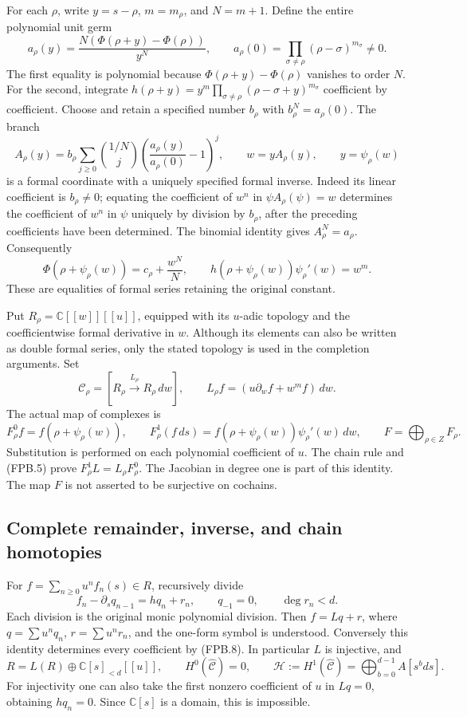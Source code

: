 For each \(\rho\), write \(y=s-\rho\), \(m=m_\rho\), and \(N=m+1\).
Define the entire polynomial unit germ
\[
 a_\rho(y)=\frac{N(\Phi(\rho+y)-\Phi(\rho))}{y^N},
 \qquad
 a_\rho(0)=\prod_{\sigma\ne\rho}(\rho-\sigma)^{m_\sigma}\ne0.
 \tag{FPB.3}\label{eq:fpb-a}
\]
The first equality is polynomial because \(\Phi(\rho+y)-\Phi(\rho)\)
vanishes to order \(N\). For the second, integrate
\(h(\rho+y)=y^m\prod_{\sigma\ne\rho}(\rho-\sigma+y)^{m_\sigma}\)
coefficient by coefficient. Choose and retain a specified number
\(b_\rho\) with \(b_\rho^N=a_\rho(0)\). The branch
\[
 A_\rho(y)=b_\rho
 \sum_{j\ge0}\binom{1/N}{j}
       \left(\frac{a_\rho(y)}{a_\rho(0)}-1\right)^j,
 \qquad w=yA_\rho(y),\qquad y=\psi_\rho(w)
 \tag{FPB.4}\label{eq:fpb-coordinate}
\]
is a formal coordinate with a uniquely specified formal inverse.
Indeed its linear coefficient is \(b_\rho\ne0\); equating the
coefficient of \(w^n\) in \(\psi A_\rho(\psi)=w\) determines the
coefficient of \(w^n\) in \(\psi\) uniquely by division by
\(b_\rho\), after the preceding coefficients have been determined.
The binomial identity gives \(A_\rho^N=a_\rho\). Consequently
\[
 \Phi(\rho+\psi_\rho(w))=c_\rho+\frac{w^N}{N},
 \qquad h(\rho+\psi_\rho(w))\psi_\rho'(w)=w^m.
 \tag{FPB.5}\label{eq:fpb-phase}
\]
These are equalities of formal series retaining the original constant.

Put \(R_\rho=\mathbb{C}[[w]][[u]]\), equipped with its \(u\)-adic
topology and the coefficientwise formal derivative in \(w\). Although
its elements can also be written as double formal series, only the
stated topology is used in the completion arguments. Set
\[
 \mathcal C_\rho=[R_\rho\xrightarrow{L_\rho}R_\rho\,dw],
 \qquad L_\rho f=(u\partial_w f+w^m f)\,dw.
 \tag{FPB.6}\label{eq:fpb-local-complex}
\]
The actual map of complexes is
\[
 F^0_\rho f=f(\rho+\psi_\rho(w)),\qquad
 F^1_\rho(f\,ds)=f(\rho+\psi_\rho(w))\psi_\rho'(w)\,dw,
 \qquad F=\bigoplus_{\rho\in Z}F_\rho.
 \tag{FPB.7}\label{eq:fpb-chain-map}
\]
Substitution is performed on each polynomial coefficient of \(u\).
The chain rule and (FPB.5) prove \(F^1_\rho L=L_\rho F^0_\rho\).
The Jacobian in degree one is part of this identity. The map \(F\)
is not asserted to be surjective on cochains.

\subsection{Complete remainder, inverse, and chain homotopies}

For \(f=\sum_{n\ge0}u^nf_n(s)\in R\), recursively divide
\[
 f_n-\partial_s q_{n-1}=h q_n+r_n,
 \qquad q_{-1}=0,\qquad \deg r_n<d.
 \tag{FPB.8}\label{eq:fpb-global-division}
\]
Each division is the original monic polynomial division. Then
\(f=Lq+r\), where \(q=\sum u^nq_n\), \(r=\sum u^nr_n\), and the
one-form symbol is understood. Conversely this identity determines
every coefficient by (FPB.8). In particular \(L\) is injective, and
\[
 R=L(R)\oplus\mathbb{C}[s]_{<d}[[u]],\qquad
 H^0(\widehat{\mathcal C})=0,\qquad
 \mathcal H:=H^1(\widehat{\mathcal C})
       =\bigoplus_{b=0}^{d-1}A[s^bds].
 \tag{FPB.9}\label{eq:fpb-global-remainder}
\]
For injectivity one can also take the first nonzero coefficient of
\(u\) in \(Lq=0\), obtaining \(h q_n=0\). Since
\(\mathbb{C}[s]\) is a domain, this is impossible.

